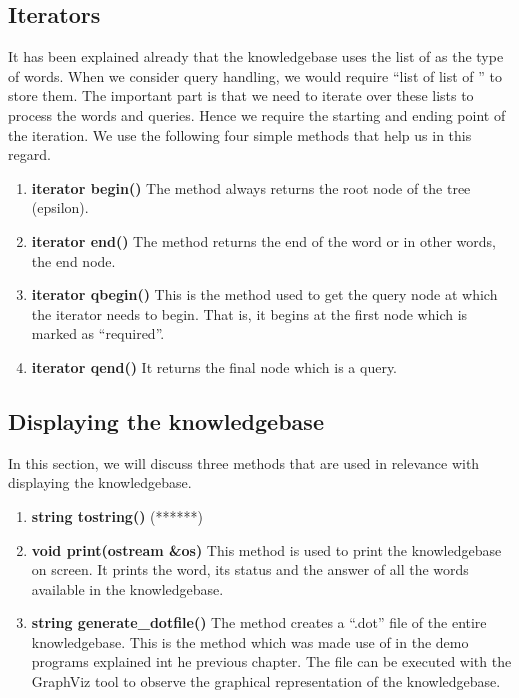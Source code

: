 \subsection{Iterators}
	It has been explained already that the knowledgebase uses the list of \integer as the type of words. When we consider query handling, we would require ``list of list of \integer'' to store them. The important part is that we need to iterate over these lists to process the words and queries. Hence we require the starting and ending point of the iteration. We use the following four simple methods that help us in this regard.
\begin{enumerate}
\item \textbf{iterator begin()} \hfill \vskip 1pt
	The method always returns the root node of the tree (epsilon).

\item \textbf{iterator end()} \hfill \vskip 1pt
	The method returns the end of the word or in other words, the end node. 
	 
\item \textbf{iterator qbegin()} \hfill \vskip 1pt
	This is the method used to get the query node at which the iterator needs to begin. That is, it begins at the first node which is marked as ``required''.
	
\item \textbf{iterator qend()} \hfill \vskip 1pt
	It returns the final node which is a query.
\end{enumerate}

\subsection{Displaying the knowledgebase}
In this section, we will discuss three methods that are used in relevance with displaying the knowledgebase.
\begin{enumerate}
\item \textbf{string tostring()} \hfill \vskip 1pt
(******)

\item \textbf{void print(ostream \&os)} \hfill \vskip 1pt
	This method is used to print the knowledgebase on screen. It prints the word, its status and the answer of all the words available in the knowledgebase.

\item \textbf{string generate\_dotfile()} \hfill \vskip 1pt
	The method creates a ``.dot'' file of the entire knowledgebase. This is the method which was made use of in the demo programs explained int he previous chapter. The file can be executed with the GraphViz tool to observe the graphical representation of the knowledgebase. 
\end {enumerate}

